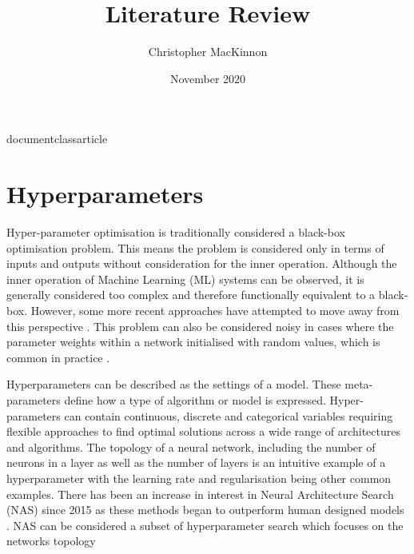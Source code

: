 documentclass{article}
\usepackage[utf8]{inputenc}

\title{Literature Review}
\author{Christopher MacKinnon }
\date{November 2020}



\usepackage[
style=ieee,
sorting=ynt,
backend=biber
]{biblatex}





\usepackage{graphicx,amsmath,bm,caption}
\usepackage[ruled,vlined]{algorithm2e}





\maketitle

	\section{Hyperparameters}

Hyper-parameter optimisation is traditionally considered a black-box optimisation problem. This means the problem is considered only in terms of inputs and outputs without consideration for the inner operation. Although the inner operation of Machine Learning (ML) systems can be observed, it is generally considered too complex and therefore functionally equivalent to a black-box. However, some more recent approaches have attempted to move away from this perspective \cite{NAS-RL,darts}. This problem can also be considered noisy in cases where the parameter weights within a network initialised with random values, which is common in practice \cite{reproduce}.   


Hyperparameters can be described as the settings of a model. These meta-parameters define how a type of algorithm or model is expressed. Hyper-parameters can contain continuous, discrete and categorical variables requiring flexible approaches to find optimal solutions across a wide range of architectures and algorithms. The topology of a neural network, including the number of neurons in a layer as well as the number of layers is an intuitive example of a hyperparameter with the learning rate and regularisation being other common examples. There has been an increase in interest in Neural Architecture Search (NAS) since 2015 as these methods began to outperform human designed models \cite{51}\cite{41}. NAS can be considered a subset of hyperparameter search which focuses on the networks topology 


